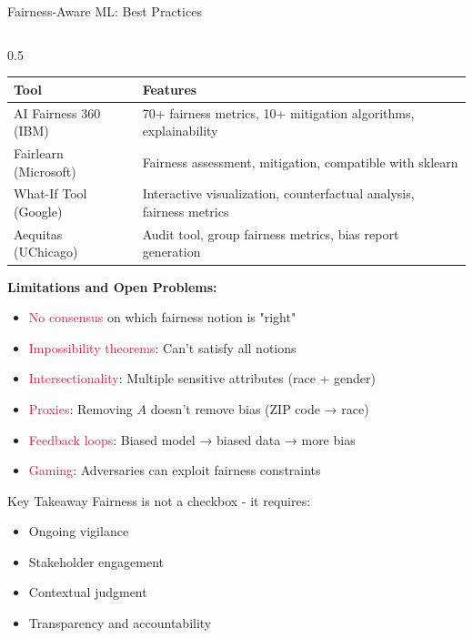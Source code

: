 \begin{frame}{Fairness-Aware ML: Best Practices}
\begin{columns}
\begin{column}{0.5\textwidth}
\begin{table}
\centering
\tiny
\begin{tabular}{lp{4cm}}
\toprule
\textbf{Tool} & \textbf{Features} \\
\midrule
AI Fairness 360 (IBM) & 70+ fairness metrics, 10+ mitigation algorithms, explainability \\
\midrule
Fairlearn (Microsoft) & Fairness assessment, mitigation, compatible with sklearn \\
\midrule
What-If Tool (Google) & Interactive visualization, counterfactual analysis, fairness metrics \\
\midrule
Aequitas (UChicago) & Audit tool, group fairness metrics, bias report generation \\
\bottomrule
\end{tabular}
\end{table}

\vspace{0.3cm}
\textbf{Limitations and Open Problems:}

\begin{itemize}
\item \textcolor{crimson}{No consensus} on which fairness notion is "right"
\item \textcolor{crimson}{Impossibility theorems}: Can't satisfy all notions
\item \textcolor{crimson}{Intersectionality}: Multiple sensitive attributes (race + gender)
\item \textcolor{crimson}{Proxies}: Removing $A$ doesn't remove bias (ZIP code → race)
\item \textcolor{crimson}{Feedback loops}: Biased model → biased data → more bias
\item \textcolor{crimson}{Gaming}: Adversaries can exploit fairness constraints
\end{itemize}

\vspace{0.3cm}
\begin{alertblock}{Key Takeaway}
Fairness is not a checkbox - it requires:
\begin{itemize}
\item Ongoing vigilance
\item Stakeholder engagement
\item Contextual judgment
\item Transparency and accountability
\end{itemize}
\end{alertblock}
\end{column}
\end{columns}
\end{frame}


